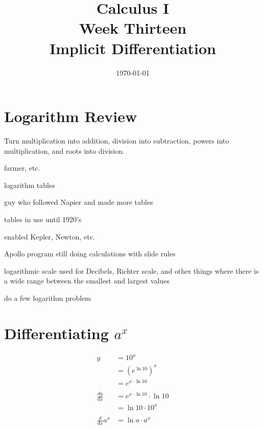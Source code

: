 \documentclass[letterpaper, landscape]{exam}
\author{}
\date{\today}
\title{Calculus I \\ Week Thirteen \\ Implicit Differentiation}
\begin{document}
  \maketitle
  \tableofcontents

  \newpage 

  \section{Logarithm Review} %
  
  \begin{itemize*}
    \item Turn multiplication into addition, division into subtraction, powers into multiplication,
      and roots into division.
    \item farmer, etc.
    \item logarithm tables
    \item guy who followed Napier and made more tables
    \item tables in use until 1920's
    \item enabled Kepler, Newton, etc.
    \item Apollo program still doing calculations with slide rules
    \item logarithmic scale used for Decibels, Richter scale, and other things where there is a wide
      range between the smallest and largest values
    \item do a few logarithm problem
  \end{itemize*}
  
  \section{Differentiating $a^x$} %
  
  \begin{align*}
    y             & = 10^x \\
                  & = \left( e^{\ln 10} \right)^x \\
                  & = e^{x \cdot \ln 10} \\
    \\
    \frac{dy}{dx} & = e^{x \cdot \ln 10} \cdot \ln 10 \\
                  & = \ln 10 \cdot 10^x \\
    \\
    \frac{d}{dx} a^x &= \ln a \cdot a^x \\
  \end{align*}
\end{document}
